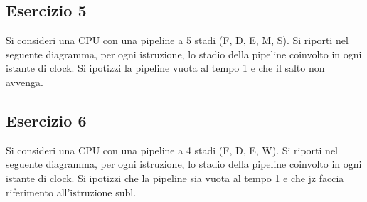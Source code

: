 \documentclass[a4paper]{article}
\theoremstyle{break}
\theoremstyle{break}
\theoremstyle{break}
\theoremstyle{break}
\begin{document}
\subsection{Esercizio 5}
Si consideri una CPU con una pipeline a 5 stadi (F, D, E, M, S). Si riporti nel seguente diagramma,
per ogni istruzione, lo stadio della pipeline coinvolto in ogni istante di clock. Si ipotizzi la pipeline
vuota al tempo 1 e che il salto non avvenga.

\begin{table}[H]
  \centering
\end{table}

\subsection{Esercizio 6}
Si consideri una CPU con una pipeline a 4 stadi (F, D, E, W). Si riporti nel seguente diagramma, per
ogni istruzione, lo stadio della pipeline coinvolto in ogni istante di clock. Si ipotizzi che la pipeline
sia vuota al tempo 1 e che jz faccia riferimento all’istruzione subl.

\begin{table}[H]
  \centering
\end{table}
\end{document}
